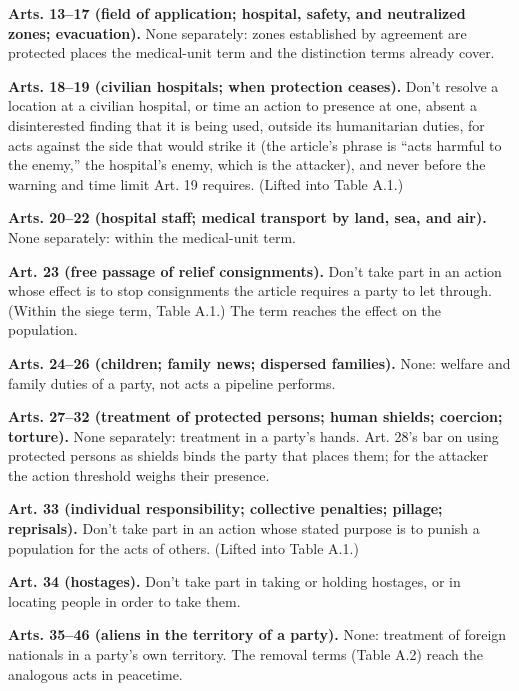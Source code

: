 \textbf{Arts. 13–17 (field of application; hospital, safety, and neutralized zones; evacuation).} None separately: zones established by agreement are protected places the medical-unit term and the distinction terms already cover.

\textbf{Arts. 18–19 (civilian hospitals; when protection ceases).} Don't resolve a location at a civilian hospital, or time an action to presence at one, absent a disinterested finding that it is being used, outside its humanitarian duties, for acts against the side that would strike it (the article's phrase is “acts harmful to the enemy,” the hospital's enemy, which is the attacker), and never before the warning and time limit Art. 19 requires. (Lifted into Table A.1.)

\textbf{Arts. 20–22 (hospital staff; medical transport by land, sea, and air).} None separately: within the medical-unit term.

\textbf{Art. 23 (free passage of relief consignments).} Don't take part in an action whose effect is to stop consignments the article requires a party to let through. (Within the siege term, Table A.1.) The term reaches the effect on the population.

\textbf{Arts. 24–26 (children; family news; dispersed families).} None: welfare and family duties of a party, not acts a pipeline performs.

\textbf{Arts. 27–32 (treatment of protected persons; human shields; coercion; torture).} None separately: treatment in a party's hands. Art. 28's bar on using protected persons as shields binds the party that places them; for the attacker the action threshold weighs their presence.

\textbf{Art. 33 (individual responsibility; collective penalties; pillage; reprisals).} Don't take part in an action whose stated purpose is to punish a population for the acts of others. (Lifted into Table A.1.)

\textbf{Art. 34 (hostages).} Don't take part in taking or holding hostages, or in locating people in order to take them.

\textbf{Arts. 35–46 (aliens in the territory of a party).} None: treatment of foreign nationals in a party's own territory. The removal terms (Table A.2) reach the analogous acts in peacetime.

